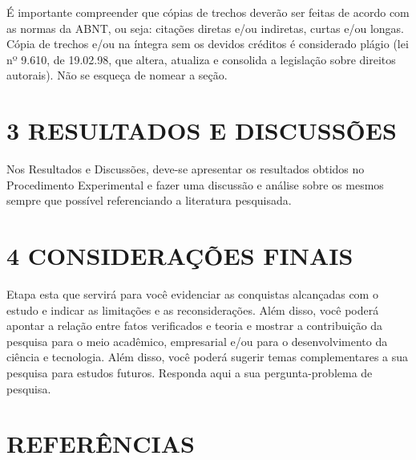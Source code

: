 \documentclass[
]{article}
\begin{document}
É importante compreender que cópias de trechos deverão ser feitas de
acordo com as normas da ABNT, ou seja: citações diretas e/ou indiretas,
curtas e/ou longas. Cópia de trechos e/ou na íntegra sem os devidos
créditos é considerado plágio (lei nº 9.610, de 19.02.98, que altera,
atualiza e consolida a legislação sobre direitos autorais). Não se
esqueça de nomear a seção.

\section{3 RESULTADOS E DISCUSSÕES}\label{resultados-e-discussuxf5es}

Nos Resultados e Discussões, deve-se apresentar os resultados obtidos no
Procedimento Experimental e fazer uma discussão e análise sobre os
mesmos sempre que possível referenciando a literatura pesquisada.

\section{4 CONSIDERAÇÕES FINAIS}\label{considerauxe7uxf5es-finais}

Etapa esta que servirá para você evidenciar as conquistas alcançadas com
o estudo e indicar as limitações e as reconsiderações. Além disso, você
poderá apontar a relação entre fatos verificados e teoria e mostrar a
contribuição da pesquisa para o meio acadêmico, empresarial e/ou para o
desenvolvimento da ciência e tecnologia. Além disso, você poderá sugerir
temas complementares a sua pesquisa para estudos futuros. Responda aqui
a sua pergunta-problema de pesquisa.

\section*{REFERÊNCIAS}\label{referuxeancias}
\end{document}
